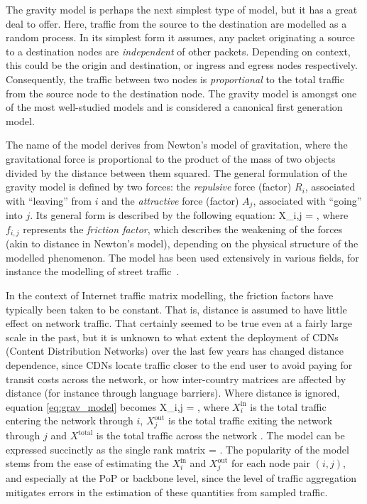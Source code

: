 The gravity model is perhaps the next simplest type of model, but it
has a great deal to offer. Here, traffic from the source to the destination
are modelled as a random process. In its simplest form it assumes, any
packet originating a source to a destination nodes are \emph{independent}
of other packets. 
Depending on context, this could be the origin and destination, or ingress
and egress nodes respectively.  Consequently, the traffic between 
two nodes is \emph{proportional} to
the total traffic from the source node to the destination node. The
gravity model is amongst one of the most well-studied
models and is considered a canonical first generation model.

The name of the model derives from Newton's model of gravitation,
where the gravitational force is proportional to the product of the
mass of two objects divided by the distance between them squared. The
general formulation of the gravity model is defined by two forces: the
\emph{repulsive} force (factor) $R_i$, associated with ``leaving''
from $i$ and the \emph{attractive} force (factor) $A_j$, associated
with ``going'' into $j$. Its general form is described by the
following equation: \be X_{i,j} = ,
\label{eq:grav_model}
\ee where $f_{i,j}$ represents the \emph{friction factor}, which
describes the weakening of the forces (akin to distance in Newton's
model), depending on the physical structure of the modelled
phenomenon. The model has been used extensively in various fields, for
instance the modelling of street traffic~\cite{potts72}. 
 
In the context of Internet traffic matrix modelling, the friction
factors have typically been taken to be constant. That is, distance is
assumed to have little effect on network traffic. That certainly
seemed to be true even at a fairly large scale in the past, but it is
unknown to what extent the deployment of CDNs (Content Distribution
Networks) over the last few years has changed distance dependence, 
since CDNs locate traffic closer to the end user to avoid paying for
transit costs across the network, or
how inter-country matrices are affected by distance (for instance
through language barriers). Where distance is ignored, equation
\autoref{eq:grav_model} becomes 
\be X_{i,j} =
,
\label{eq:network_grav}
\ee
where $X_i^{\text{in}}$ is the total traffic entering the
network through $i$, $X_j^{\text{out}}$ is the total traffic exiting
the network through $j$ and $X^{\text{total}}$ is the total traffic
across the network \cite{Zhang03Fast}. The model can be expressed
succinctly as the single rank matrix 
\be 
\bX =
.
\label{eq:network_grav_mtx}
\ee
The popularity of the model stems from the ease of
estimating the $X_i^{\text{in}}$ and $X_j^{\text{out}}$ for each node
pair $(i,j)$, and especially at the PoP or backbone level, since the
level of traffic aggregation mitigates errors in the estimation of
these quantities from sampled traffic.

